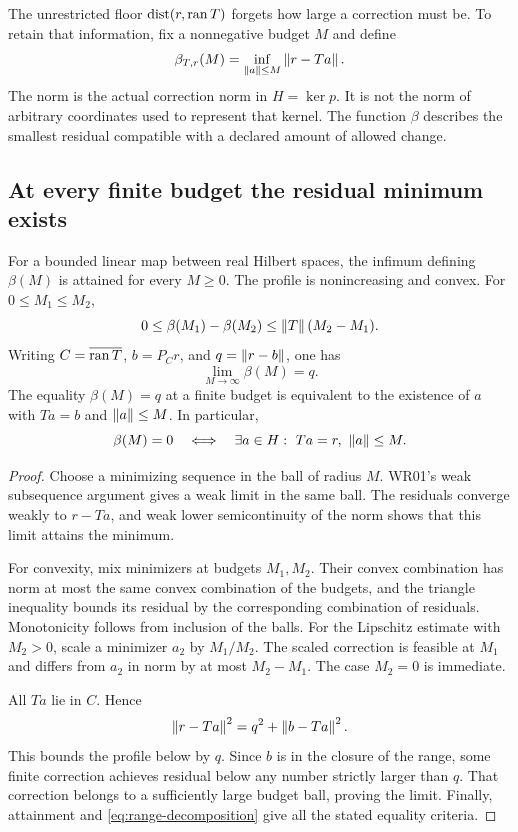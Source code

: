\label{sec:budget-frontier}
The unrestricted floor $\operatorname{dist}(r,\operatorname{ran} T)$ forgets how large a correction must be. To retain that information, fix a nonnegative budget $M$ and define
\[
 \beta_{T,r}(M)=\inf_{\left\lVert a\right\rVert\le M}\left\lVert r-Ta\right\rVert.
\]
The norm is the actual correction norm in $H=\ker p$. It is not the norm of arbitrary coordinates used to represent that kernel. The function $\beta$ describes the smallest residual compatible with a declared amount of allowed change.

\subsection{At every finite budget the residual minimum exists}
\begin{theorem}\label{WR03}
For a bounded linear map between real Hilbert spaces, the infimum defining $\beta(M)$ is attained for every $M\ge0$. The profile is nonincreasing and convex. For $0\le M_1\le M_2$,
\[
 0\le\beta(M_1)-\beta(M_2)\le\left\lVert T\right\rVert(M_2-M_1).
\]
Writing $C=\overline{\operatorname{ran} T}$, $b=P_Cr$, and $q=\left\lVert r-b\right\rVert$, one has
\[
 \lim_{M\to\infty}\beta(M)=q.
\]
The equality $\beta(M)=q$ at a finite budget is equivalent to the existence of $a$ with $Ta=b$ and $\left\lVert a\right\rVert\le M$. In particular,
\[
 \beta(M)=0\quad\Longleftrightarrow\quad
 \exists a\in H:\ Ta=r,\ \left\lVert a\right\rVert\le M.
\]
\end{theorem}
\begin{proof}
Choose a minimizing sequence in the ball of radius $M$. WR01's weak subsequence argument gives a weak limit in the same ball. The residuals converge weakly to $r-Ta$, and weak lower semicontinuity of the norm shows that this limit attains the minimum.

For convexity, mix minimizers at budgets $M_1,M_2$. Their convex combination has norm at most the same convex combination of the budgets, and the triangle inequality bounds its residual by the corresponding combination of residuals. Monotonicity follows from inclusion of the balls. For the Lipschitz estimate with $M_2>0$, scale a minimizer $a_2$ by $M_1/M_2$. The scaled correction is feasible at $M_1$ and differs from $a_2$ in norm by at most $M_2-M_1$. The case $M_2=0$ is immediate.

All $Ta$ lie in $C$. Hence
\begin{equation}\label{eq:range-decomposition}
 \left\lVert r-Ta\right\rVert^2=q^2+\left\lVert b-Ta\right\rVert^2.
\end{equation}
This bounds the profile below by $q$. Since $b$ is in the closure of the range, some finite correction achieves residual below any number strictly larger than $q$. That correction belongs to a sufficiently large budget ball, proving the limit. Finally, attainment and \eqref{eq:range-decomposition} give all the stated equality criteria.
\end{proof}

